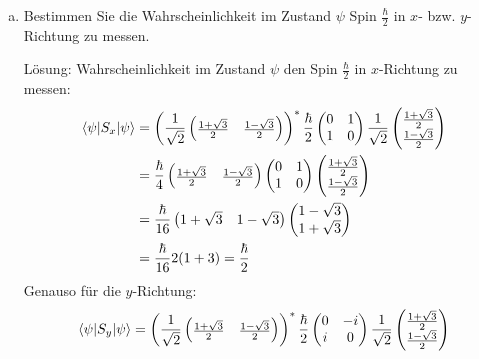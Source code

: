 \documentclass{scrartcl}
\begin{document}
\begin{enumerate}[a)]
\item Bestimmen Sie die Wahrscheinlichkeit im Zustand $\psi$ Spin $\frac{\hbar}{2}$ in $x$- bzw. $y$-Richtung zu messen.
\item[Lösung:]
Wahrscheinlichkeit im Zustand $\psi$ den Spin $\frac\hbar 2$ in $x$-Richtung zu messen:
\begin{align*}
\braket{\psi|S_x|\psi}	
	&= 
	\left(\frac 1{\sqrt 2} \begin{pmatrix}\frac{1+\sqrt 3}{2} & \frac{1-\sqrt 3}{2}\end{pmatrix}\right)^\ast
	\frac \hbar 2 \begin{pmatrix} 0&1\\1&0 \end{pmatrix}
	\frac 1{\sqrt 2}\begin{pmatrix}\frac{1+\sqrt 3}{2}\\\frac{1-\sqrt 3}{2}\end{pmatrix}\\
	&= 	
	\frac \hbar 4 \begin{pmatrix}\frac{1+\sqrt 3}{2} & \frac{1-\sqrt 3}{2}\end{pmatrix}
	\begin{pmatrix} 0&1\\1&0 \end{pmatrix}
	\begin{pmatrix}\frac{1+\sqrt 3}{2}\\\frac{1-\sqrt 3}{2}\end{pmatrix}\\
	&=
	\frac \hbar {16} \begin{pmatrix}1+\sqrt 3 & 1-\sqrt 3\end{pmatrix}
	\begin{pmatrix}1-\sqrt 3\\1+\sqrt 3\end{pmatrix}\\
	&=
	\frac \hbar {16} 2 (1 + 3) = \frac \hbar 2
\end{align*}
Genauso für die $y$-Richtung:
\begin{align*}
\braket{\psi|S_y|\psi}	
	&= 
	\left(\frac 1{\sqrt 2} \begin{pmatrix}\frac{1+\sqrt 3}{2} & \frac{1-\sqrt 3}{2}\end{pmatrix}\right)^\ast
	\frac \hbar 2 \begin{pmatrix} 0&-i\\i&0 \end{pmatrix}
	\frac 1{\sqrt 2}\begin{pmatrix}\frac{1+\sqrt 3}{2}\\\frac{1-\sqrt 3}{2}\end{pmatrix}\\

\end{align*}
\end{enumerate}
\end{document}

